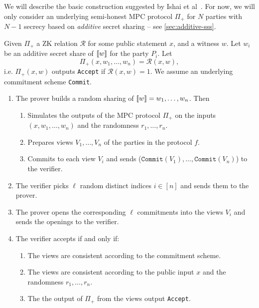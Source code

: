 \documentclass[11pt]{report}
\theoremstyle{definition}
\theoremstyle{plain}
\begin{document}
We will describe the basic construction suggested by Ishai et al~\cite{ishai2007zero}. For now, we will only consider an underlying semi-honest MPC protocol $\Pi_+$ for $N$ parties with $N-1$ secrecy based on \textit{additive} secret sharing -- see \autoref{sec:additive-sss}.

\begin{protocol}\label{def:mpcinth_basic}
  Given $\Pi_+$ a ZK relation $\mathcal{R}$ for some public statement $x$, and a witness $w$. Let $w_i$ be an additive secret share of $\llbracket w \rrbracket$ for the party $P_i$. Let \[ \Pi_+(x, w_1, \dots, w_n) = \mathcal{R}(x, w), \] i.e. $\Pi_+(x,w)$ outputs \texttt{Accept} if $\mathcal{R}(x,w) = 1$. We assume an underlying commitment scheme \texttt{Commit}.

  \begin{enumerate}[parsep=2pt, itemsep=0pt]
    \item The prover builds a random sharing of $\llbracket w \rrbracket = w_1, \dots, w_n$. Then
          \begin{enumerate}[nolistsep]
            \item Simulates the outputs of the MPC protocol $\Pi_+$ on the inputs $(x, w_1, \dots, w_n)$ and the randomness $r_1, \dots, r_n$.
            \item Prepares views $V_1, \dots, V_n$ of the parties in the protocol $f$.
            \item Commits to each view $V_i$ and sends ($\texttt{Commit}(V_1), \dots, \texttt{Commit}(V_n)$) to the verifier.
          \end{enumerate}
    \item The verifier picks $\ell$ random distinct indices $i \in [n]$ and sends them to the prover.
    \item The prover opens the corresponding $\ell$ commitments into the views $V_i$ and sends the openings to the verifier.
    \item The verifier accepts if and only if:
          \begin{enumerate}[nolistsep]
            \item\label{prop:mpcinth_commit} The views are consistent according to the commitment scheme.
            \item\label{prop:mpcinth_consistent} The views are consistent according to the public input $x$ and the randomness $r_1, \dots, r_n$.
            \item\label{prop:mpcinth_knowledge} The the output of $\Pi_+$ from the views output \texttt{Accept}.
          \end{enumerate}
  \end{enumerate}
\end{protocol}
\end{document}
